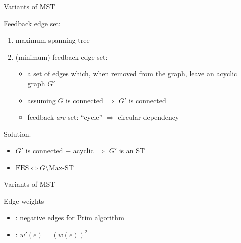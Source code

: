 \begin{frame}{Variants of MST}
  \begin{exampleblock}{Feedback edge set: }
    \begin{enumerate}
      \item maximum spanning tree
      \item (minimum) feedback edge set:
	\begin{itemize}
	  \item a set of edges which, when removed from the graph, leave an acyclic graph $G'$
	  \item assuming $G$ is connected $\Rightarrow$ $G'$ is connected
	  \item feedback \emph{arc} set: ``cycle'' $\Rightarrow$ circular dependency
	\end{itemize}
    \end{enumerate}
  \end{exampleblock}

  \begin{block}{Solution.}
    \begin{itemize}
      \item $G'$ is connected + acyclic $\Rightarrow$ $G'$ is an ST
      \item $\textrm{FES} \Leftrightarrow G \setminus \textrm{Max-ST}$
    \end{itemize}
  \end{block}
\end{frame}
\begin{frame}{Variants of MST}
  \begin{exampleblock}{Edge weights }
    \begin{itemize}
      \item {}: negative edges for Prim algorithm
      \item {}: $w'(e) = (w(e))^{2}$
    \end{itemize}
  \end{exampleblock}
\end{frame}
